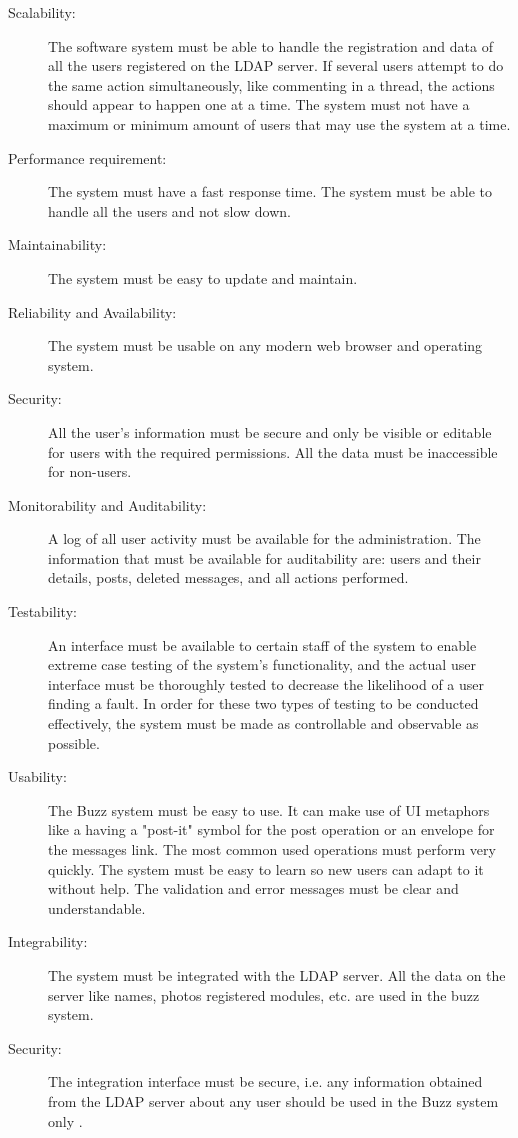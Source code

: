 \documentclass[12pt]{article}
\begin{document}
\begin{description}
  \item[Scalability:] 
        The software system must be able to handle the registration and data of all the users registered on the LDAP server. 
       If several users attempt to do the same action simultaneously, like commenting in a thread, the actions should appear to happen one at a time. 
      The system must not have a maximum or minimum amount of users that may use the system at a time.
  \item[Performance requirement:]
      The system must have a fast response time. The system must be able to handle all the users and not slow down.
  \item[Maintainability:] 
      The system must be easy to update and maintain.
  \item[Reliability and Availability:]
      The system must be usable on any modern web browser and operating system.
  \item[Security:]
      All the user's information must be secure and only be visible or editable for users with the required permissions. All the data must be inaccessible for non-users.
  \item[Monitorability and Auditability:]
      A log of all user activity must be available for the administration. The information that must be available for auditability are: users and their details, posts, deleted messages, and all actions performed.
  \item[Testability:]
      An interface must be available to certain staff of the system to enable extreme case testing of the system's functionality, and the actual user interface must be thoroughly tested to decrease the likelihood of a user finding a fault. In order for these two types of testing to be conducted effectively, the system must be made as controllable and observable as possible.
  \item[Usability:]
      The Buzz system must be easy to use. It can make use of UI metaphors like a having a "post-it" symbol for the post operation or an envelope for the messages link.
      The most common used operations must perform very quickly. The system must be easy to learn so new users can adapt to it without help. 
      The validation and error messages must be clear and understandable.
  \item[Integrability:]
      The system must be integrated with the LDAP server. 
      All the data on the server like names, photos registered modules, etc. are used in the buzz system. 
\item[Security:]
The integration interface must be secure, i.e. any information obtained from the LDAP server about any user should be used in the Buzz system only .
\end{description}
\end{document}
